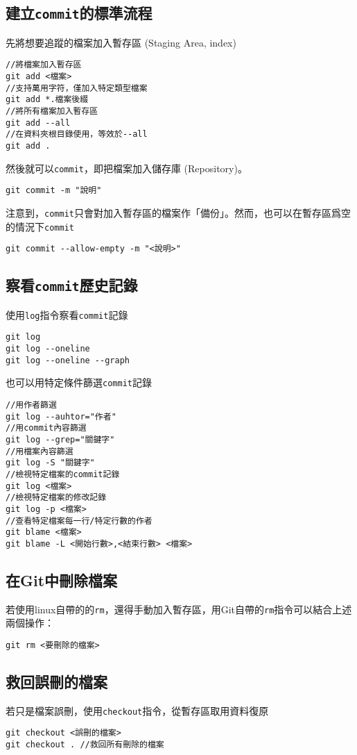 \documentclass{article}
\begin{document}
\subsection{建立\texttt{commit}的標準流程}
先將想要追蹤的檔案加入暫存區 (Staging Area, index)
\begin{lstlisting}[language=git]
//將檔案加入暫存區 
git add <檔案>
//支持萬用字符，僅加入特定類型檔案
git add *.檔案後綴
//將所有檔案加入暫存區
git add --all
//在資料夾根目錄使用，等效於--all
git add .
\end{lstlisting}
然後就可以\texttt{commit}，即把檔案加入儲存庫 (Repository)。
\begin{lstlisting}[language=git]
git commit -m "說明"
\end{lstlisting}
注意到，\texttt{commit}只會對加入暫存區的檔案作「備份」。然而，也可以在暫存區爲空的情況下\texttt{commit}
\begin{lstlisting}[language=git]
git commit --allow-empty -m "<說明>"
\end{lstlisting}
\subsection{察看\texttt{commit}歷史記錄}
使用\texttt{log}指令察看\texttt{commit}記錄
\begin{lstlisting}[language=git]
git log
git log --oneline
git log --oneline --graph
\end{lstlisting}
也可以用特定條件篩選\texttt{commit}記錄
\begin{lstlisting}[language=git]
//用作者篩選
git log --auhtor="作者"
//用commit內容篩選
git log --grep="關鍵字"
//用檔案內容篩選
git log -S "關鍵字"
//檢視特定檔案的commit記錄
git log <檔案>
//檢視特定檔案的修改記錄
git log -p <檔案>
//查看特定檔案每一行/特定行數的作者
git blame <檔案>
git blame -L <開始行數>,<結束行數> <檔案> 
\end{lstlisting}

\subsection{在Git中刪除檔案}
若使用linux自帶的的\texttt{rm}，還得手動加入暫存區，用Git自帶的\texttt{rm}指令可以結合上述兩個操作：
\begin{lstlisting}[language=git]
git rm <要刪除的檔案>
\end{lstlisting}

\subsection{救回誤刪的檔案}
若只是檔案誤刪，使用\texttt{checkout}指令，從暫存區取用資料復原
\begin{lstlisting}[language=git]
git checkout <誤刪的檔案> 
git checkout . //救回所有刪除的檔案
\end{lstlisting}
\end{document}
